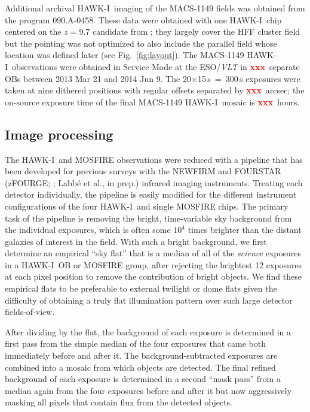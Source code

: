 \documentclass[preprint2]{aastex6}
\newcommand\xxx{{\textcolor{red}{\bf xxx}}}
\gdef\HAWKI{\mbox{HAWK-I}}
\begin{document}
Additional archival \HAWKI\ imaging of the MACS-1149 fields was obtained from the program 090.A-0458.  These data were obtained with one \HAWKI\ chip centered on the $z=9.7$ candidate from \cite{zheng:12}; they largely cover the HFF cluster field but the pointing was not optimized to also include the parallel field whose location was defined later (see Fig.~\ref{fig:layout}).  The MACS-1149 \HAWKI\ observations were obtained in Service Mode at the ESO/\textit{VLT} in \xxx\ separate OBs between 2013 Mar 21 and 2014 Jun 9.  The 20$\times$15\,s~=~300\,s exposures were taken at nine dithered positions with regular offsets separated by \xxx\ arcsec; the on-source exposure time of the final MACS-1149 \HAWKI\ mosaic is \xxx\ hours.

\subsection{Image processing}
\label{s:processing}


The \HAWKI\ and MOSFIRE observations were reduced with a pipeline that has been developed for previous surveys with the NEWFIRM \citep[NMBS;][]{whitaker:nmbs} and FOURSTAR (zFOURGE; \citealt{spitler:12}; Labb\'e et al., in prep.) infrared imaging instruments.  Treating each detector individually, the pipeline is easily modified for the different instrument configurations of the four \HAWKI\ and single MOSFIRE chips.  The primary task of the pipeline is removing the bright, time-variable sky background from the individual exposures, which is often some $10^4$ times brighter than the distant galaxies of interest in the field.  With such a bright background, we first determine an empirical ``sky flat'' that is a median of all of the \textit{science} exposures in a \HAWKI\ OB or MOSFIRE group, after rejecting the brightest 12 exposures at each pixel position to remove the contribution of bright objects.  We find these empirical flats to be preferable to external twilight or dome flats given the difficulty of obtaining a truly flat illumination pattern over such large detector fields-of-view.  

After dividing by the flat, the background of each exposure is determined in a first pass from the simple median of the four exposures that came both immediately before and after it.  The background-subtracted exposures are combined into a mosaic from which objects are detected.  The final refined background of each exposure is determined in a second ``mask pass'' from a median again from the four exposures before and after it but now aggressively masking all pixels that contain flux from the detected objects.
\end{document}
